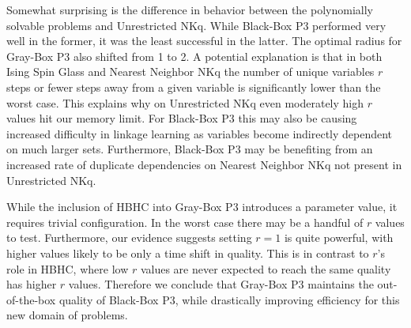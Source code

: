 \documentclass{sig-alternate}
\begin{document}
Somewhat surprising is the difference in behavior between the polynomially solvable problems
and Unrestricted NKq. While Black-Box P3 performed very well in the former, it was the least
successful in the latter. The optimal radius for Gray-Box P3 also shifted from 1 to 2.
A potential explanation is that in both Ising Spin Glass
and Nearest Neighbor NKq the number of unique variables $r$ steps
or fewer steps away from a given variable is significantly lower than the worst case. This explains why on Unrestricted NKq
even moderately high $r$ values hit our memory limit.
For Black-Box P3 this may also be causing increased difficulty in linkage learning as variables
become indirectly dependent on much larger sets. Furthermore, Black-Box
P3 may be benefiting from an increased rate of duplicate dependencies on Nearest Neighbor NKq
not present in Unrestricted NKq.

While the inclusion of HBHC into Gray-Box P3 introduces a parameter value, it requires
trivial configuration. In the worst case there may be a handful of $r$ values to test.
Furthermore, our evidence suggests setting $r=1$ is quite powerful, with higher values
likely to be only a time shift in quality. This is in contrast to $r$'s role in HBHC,
where low $r$ values are never expected to reach the same quality has higher $r$ values.
Therefore we conclude that Gray-Box P3 maintains the out-of-the-box quality of Black-Box
P3, while drastically improving efficiency for this new domain of problems.

%

%
%
\balancecolumns
\end{document}
